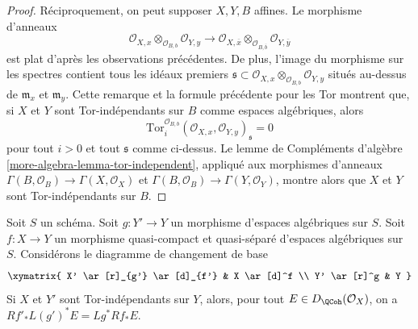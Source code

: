 \begin{proof}
\medskip\noindent
R\'eciproquement, on peut supposer $X,Y,B$ affines. Le morphisme d'anneaux
$$
\mathcal{O}_{X, x} \otimes_{\mathcal{O}_{B, b}} \mathcal{O}_{Y, y}
\longrightarrow
\mathcal{O}_{X, \overline{x}} \otimes_{\mathcal{O}_{B, \overline{b}}}
\mathcal{O}_{Y, \overline y}
$$
est plat d'apr\`es les observations pr\'ec\'edentes. De plus, l'image du
morphisme sur les spectres contient tous les id\'eaux premiers
$\mathfrak s\subset
\mathcal{O}_{X,x}\otimes_{\mathcal{O}_{B,b}}\mathcal{O}_{Y,y}$ situ\'es
au-dessus de $\mathfrak m_x$ et $\mathfrak m_y$. Cette remarque et la formule
pr\'ec\'edente pour les Tor montrent que, si $X$ et $Y$ sont
Tor-ind\'ependants sur $B$ comme espaces alg\'ebriques, alors
$$
\text{Tor}_i^{\mathcal{O}_{B, b}}
(\mathcal{O}_{X, x}, \mathcal{O}_{Y, y})_\mathfrak s = 0
$$
pour tout $i>0$ et tout $\mathfrak s$ comme ci-dessus. Le lemme de Compl\'ements
d'alg\`ebre \ref{more-algebra-lemma-tor-independent}, appliqu\'e aux morphismes
d'anneaux
$\Gamma(B,\mathcal{O}_B)\to\Gamma(X,\mathcal{O}_X)$ et
$\Gamma(B,\mathcal{O}_B)\to\Gamma(Y,\mathcal{O}_Y)$, montre alors que $X$ et
$Y$ sont Tor-ind\'ependants sur $B$.
\end{proof}

\begin{lemma}
\label{lemma-compare-base-change}
Soit $S$ un sch\'ema. Soit $g:Y'\to Y$ un morphisme d'espaces alg\'ebriques
sur $S$. Soit $f:X\to Y$ un morphisme quasi-compact et quasi-s\'epar\'e
d'espaces alg\'ebriques sur $S$. Consid\'erons le diagramme de changement de
base
$$
\xymatrix{
X' \ar[r]_{g'} \ar[d]_{f'} &
X \ar[d]^f \\
Y' \ar[r]^g &
Y
}
$$
Si $X$ et $Y'$ sont Tor-ind\'ependants sur $Y$, alors, pour tout
$E\in D_\QCoh(\mathcal{O}_X)$, on a
$Rf'_*L(g')^*E=Lg^*Rf_*E$.
\end{lemma}

